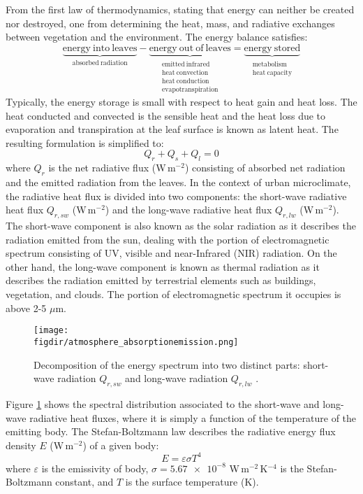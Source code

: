 From the first law of thermodynamics, stating that energy can neither be created nor destroyed, one from determining the heat, mass, and radiative exchanges between vegetation and the environment. The energy balance satisfies:
\begin{equation}
\underbrace{\mathrm{energy\ into\ leaves}}_{\mathrm{absorbed\ radiation}}
- \underbrace{\mathrm{energy\ out\ of\ leaves} }_{\substack{\mathrm{emitted\ infrared}\\\mathrm{heat\ convection}\\\mathrm{heat\ conduction}\\\mathrm{evapotranspiration}}} = \underbrace{\mathrm{energy\ stored}}_{\substack{\mathrm{metabolism}\\\mathrm{heat\ capacity}}}
\end{equation}
Typically, the energy storage is small with respect to heat gain and heat loss. The heat conducted and convected is the sensible heat and the heat loss due to evaporation and transpiration at the leaf surface is known as latent heat. The resulting formulation is simplified to:
\begin{equation}
Q_r + Q_s + Q_l = 0
\end{equation}
where $Q_r$ is the net radiative flux (W\,m$^{-2}$) consisting of absorbed net radiation and the emitted radiation from the leaves. In the context of urban microclimate, the radiative heat flux is divided into two components: the short-wave radiative heat flux $Q_{r,sw}$ (W\,m$^{-2}$) and the long-wave radiative heat flux $Q_{r,lw}$ (W\,m$^{-2}$). The short-wave component is also known as the solar radiation as it describes the radiation emitted from the sun, dealing with the portion of electromagnetic spectrum consisting of UV, visible and near-Infrared (NIR) radiation. On the other hand, the long-wave component is known as thermal radiation as it describes the radiation emitted by terrestrial elements such as buildings, vegetation, and clouds. The portion of electromagnetic spectrum it occupies is above 2-5 $\mu$m. 

\begin{figure}[t]
	\centering
	\texttt{[image: \\figdir/atmosphere\_absorptionemission.png]}
	\caption{Decomposition of the energy spectrum into two distinct parts: short-wave radiation $Q_{r,sw}$ and long-wave radiation $Q_{r,lw}$ \citep{Oke2017a}.}
	\label{fig:atmosphere_absorptionemission}
\end{figure}

Figure \ref{fig:atmosphere_absorptionemission} shows the spectral distribution associated to the short-wave and long-wave radiative heat fluxes, where it is simply a function of the temperature of the emitting body. The Stefan-Boltzmann law describes the radiative energy flux density $E$  (W\,m$^{-2}$) of a given body:
\begin{equation}
E = \varepsilon \sigma T^4
\end{equation}  
where $\varepsilon$ is the emissivity of body, $\sigma = \num{5.67e-8}$ W\,m$^{-2}$\,K$^{-4}$ is the Stefan-Boltzmann constant, and $T$ is the surface temperature (K). 

